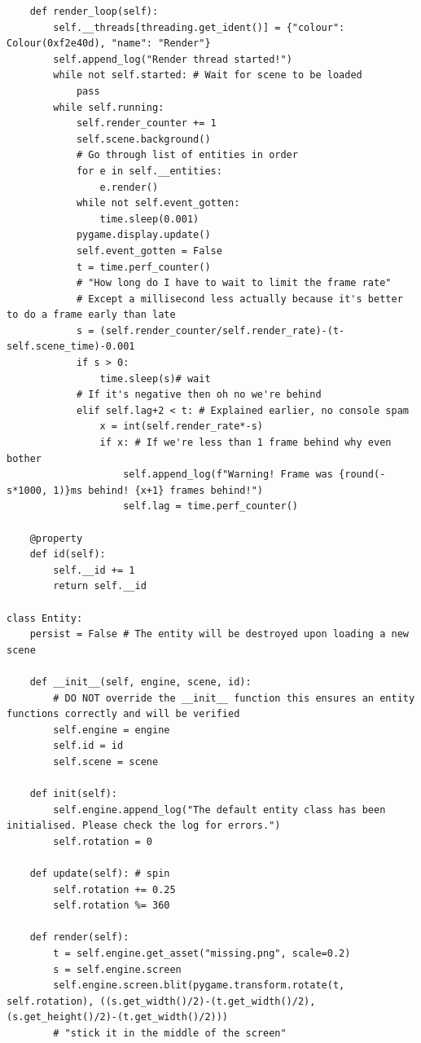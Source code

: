 \documentclass{report}
\begin{document}
\begin{verbatim}
    def render_loop(self):
        self.__threads[threading.get_ident()] = {"colour": Colour(0xf2e40d), "name": "Render"}
        self.append_log("Render thread started!")
        while not self.started: # Wait for scene to be loaded
            pass
        while self.running:
            self.render_counter += 1
            self.scene.background()
            # Go through list of entities in order
            for e in self.__entities:
                e.render()
            while not self.event_gotten:
                time.sleep(0.001)
            pygame.display.update()
            self.event_gotten = False
            t = time.perf_counter()
            # "How long do I have to wait to limit the frame rate"
            # Except a millisecond less actually because it's better to do a frame early than late
            s = (self.render_counter/self.render_rate)-(t-self.scene_time)-0.001
            if s > 0:
                time.sleep(s)# wait
            # If it's negative then oh no we're behind
            elif self.lag+2 < t: # Explained earlier, no console spam
                x = int(self.render_rate*-s)
                if x: # If we're less than 1 frame behind why even bother
                    self.append_log(f"Warning! Frame was {round(-s*1000, 1)}ms behind! {x+1} frames behind!")
                    self.lag = time.perf_counter()

    @property
    def id(self):
        self.__id += 1
        return self.__id

class Entity:
    persist = False # The entity will be destroyed upon loading a new scene

    def __init__(self, engine, scene, id):
        # DO NOT override the __init__ function this ensures an entity functions correctly and will be verified
        self.engine = engine
        self.id = id
        self.scene = scene
    
    def init(self):
        self.engine.append_log("The default entity class has been initialised. Please check the log for errors.")
        self.rotation = 0

    def update(self): # spin
        self.rotation += 0.25
        self.rotation %= 360

    def render(self):
        t = self.engine.get_asset("missing.png", scale=0.2)
        s = self.engine.screen
        self.engine.screen.blit(pygame.transform.rotate(t, self.rotation), ((s.get_width()/2)-(t.get_width()/2), (s.get_height()/2)-(t.get_width()/2)))
        # "stick it in the middle of the screen"


\end{verbatim}
\end{document}
